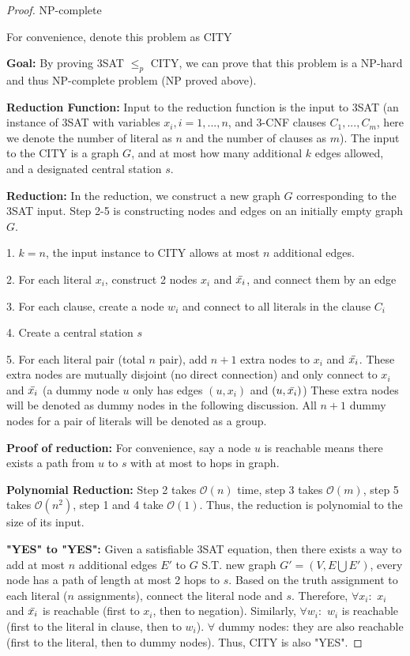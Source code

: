 \documentclass[openany]{article}
\begin{document}
\begin{proof}{NP-complete}

    For convenience, denote this problem as CITY
    
    \textbf{Goal:} By proving 3SAT $\leqslant_p$ CITY, we can prove that this problem is a NP-hard and thus NP-complete problem (NP proved above).

     \textbf{Reduction Function:} Input to the reduction function is the input to 3SAT (an instance of 3SAT with variables $x_i, i = 1,...,n$, and 3-CNF clauses $C_1, ..., C_m$, here we denote the number of literal as $n$ and the number of clauses as $m$). The input to the CITY is a graph $G$, and at most how many additional $k$ edges allowed, and a designated central station $s$. 

    \textbf{Reduction:} In the reduction, we construct a new graph $G$ corresponding to the 3SAT input. Step 2-5 is constructing nodes and edges on an initially empty graph $G$.
    
    1. $k=n$, the input instance to CITY allows at most $n$ additional edges.

    2. For each literal $x_i$, construct 2 nodes $x_i$ and $\Bar{x_i}$, and connect them by an edge

    3. For each clause, create a node $w_i$ and connect to all literals in the clause $C_i$

    4. Create a central station $s$

    5. For each literal pair (total $n$ pair), add $n+1$ extra nodes to $x_i$ and $\Bar{x_i}$. These extra nodes are mutually disjoint (no direct connection) and only connect to $x_i$ and $\Bar{x_i}$ (a dummy node $u$ only has edges $(u, x_i)$ and $(u,\Bar{x_i})$) These extra nodes will be denoted as dummy nodes in the following discussion. All $n+1$ dummy nodes for a pair of literals will be denoted as a group.

    \textbf{Proof of reduction:} For convenience, say a node $u$ is reachable means there exists a path from $u$ to $s$ with at most to hops in graph.

    
    \qquad \textbf{Polynomial Reduction:} Step 2 takes $\mathcal{O}(n)$ time, step 3 takes $\mathcal{O}(m)$, step 5 takes $\mathcal{O}(n^2)$, step 1 and 4 take $\mathcal{O}(1)$. Thus, the reduction is polynomial to the size of its input.

    \qquad \textbf{"YES" to "YES":} Given a satisfiable 3SAT equation, then there exists a way to add at most $n$ additional edges $E'$ to $G$ S.T. new graph $G'=(V,E\bigcup E')$, every node has a path of length at most 2 hops to $s$. Based on the truth assignment to each literal ($n$ assignments), connect the literal node and $s$. Therefore, $\forall x_i:$ $x_i$ and $\Bar{x_i}$ is reachable (first to $x_i$, then to negation). Similarly, $\forall w_i:$ $w_i$ is reachable (first to the literal in clause, then to $w_i$). $\forall$ dummy nodes: they are also reachable (first to the literal, then to dummy nodes). Thus, CITY is also "YES".


\end{proof}
\end{document}

